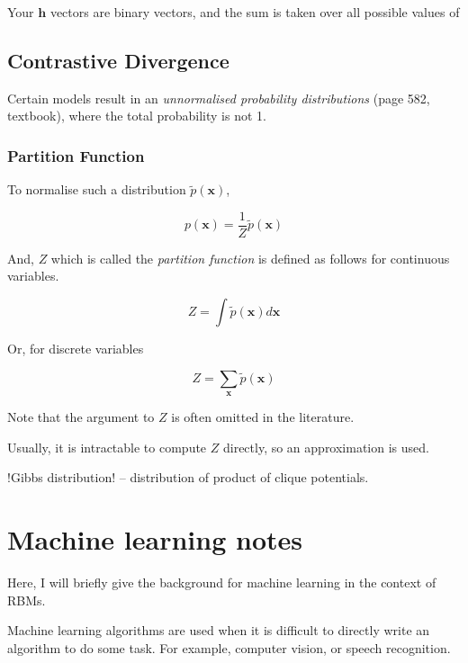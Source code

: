 \documentclass[11pt]{article}
\begin{document}
Your \(\mathbf{h}\) vectors are binary vectors, and the sum is taken over all possible values of


\subsection{Contrastive Divergence}
\label{sec:org68fbf5e}
Certain models result in an \emph{unnormalised probability distributions} (page 582, textbook), where the total probability is not 1.

\subsubsection{Partition Function}
\label{sec:orgacb1ebe}
To normalise such a distribution \(\tilde{p}(\mathbf{x})\),

\begin{equation}
p(\mathbf{x}) = \frac{1}{Z} \tilde{p}(\mathbf{x})
\end{equation}

And, \(Z\) which is called the \emph{partition function} is defined as follows for continuous variables.

\begin{equation}
Z = \int \tilde{p}(\mathbf{x}) d\mathbf{x}
\end{equation}

Or, for discrete variables

\begin{equation}
Z = \sum_{\mathbf{x}} \tilde{p}(\mathbf{x})
\end{equation}

Note that the argument to \(Z\) is often omitted in the literature.

Usually, it is intractable to compute \(Z\) directly, so an approximation is used.

\begin{Notes}
!Gibbs distribution! -- distribution of product of clique potentials.
\end{Notes}

\section{Machine learning notes}
\label{sec:orgf96dc4d}
Here, I will briefly give the background for machine learning in the context of RBMs.

Machine learning algorithms are used when it is difficult to directly write an algorithm to do some task. For example, computer vision, or speech recognition.
\end{document}
